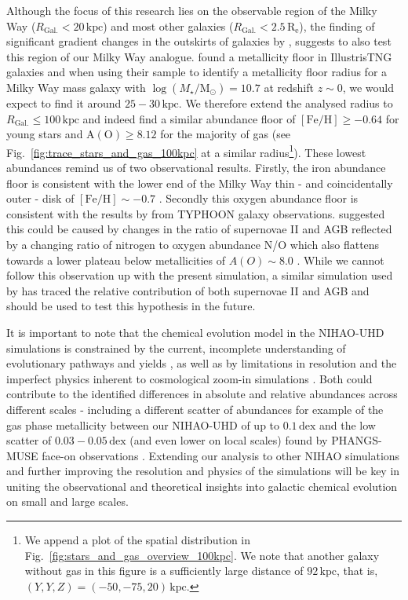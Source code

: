 \documentclass[twocolumn,apj,numberedappendix,appendixfloats]{openjournal}
\begin{document}
\begin{CJK*}{UTF8}{gbsn}
Although the focus of this research lies on the observable region of the Milky Way ($R_\mathrm{Gal.} < 20\,\mathrm{kpc}$) and most other galaxies ($R_\mathrm{Gal.} < 2.5\,\mathrm{R_e}$), the finding of significant gradient changes in the outskirts of galaxies by \citet{Garcia2023}, suggests to also test this region of our Milky Way analogue. \citet[][see their Fig.~4]{Garcia2023} found a metallicity floor in IllustrisTNG galaxies and when using their sample to identify a metallicity floor radius for a Milky Way mass galaxy with $\log(M_\star/\mathrm{M_\odot}) = 10.7$ \citep{BlandHawthorn_Gerhard2016} at redshift $z \sim 0$, we would expect to find it around $25-30\,\mathrm{kpc}$. We therefore extend the analysed radius to $R_\mathrm{Gal.} \leq 100\,\mathrm{kpc}$ and indeed find a similar abundance floor of $\mathrm{[Fe/H]} \geq -0.64$ for young stars and $\mathrm{A(O)} \geq 8.12$ for the majority of gas (see Fig.~\ref{fig:trace_stars_and_gas_100kpc} at a similar radius\footnote{We append a plot of the spatial distribution in Fig.~\ref{fig:stars_and_gas_overview_100kpc}. We note that another galaxy without gas in this figure is a sufficiently large distance of $92\,\mathrm{kpc}$, that is, $(Y,Y,Z) = (-50,-75,20)\,\mathrm{kpc}$.}). These lowest abundances remind us of two observational results. Firstly, the iron abundance floor is consistent with the lower end of the Milky Way thin - and coincidentally outer - disk of $\mathrm{[Fe/H]} \sim -0.7$ \citep{Bensby2014, Buder2019}. Secondly this oxygen abundance floor is consistent with the results by \citet{Grasha2022} from TYPHOON galaxy observations. \citet{Grasha2022} suggested this could be caused by changes in the ratio of supernovae II and AGB reflected by a changing ratio of nitrogen to oxygen abundance N/O which also flattens towards a lower plateau below metallicities of $A(O) \sim 8.0$ \citep{Nicholls2017}. While we cannot follow this observation up with the present simulation, a similar simulation used by \citet{Buder2024} has traced the relative contribution of both supernovae II and AGB and should be used to test this hypothesis in the future.

It is important to note that the chemical evolution model in the NIHAO-UHD simulations is constrained by the current, incomplete understanding of evolutionary pathways and yields \citep{Buck2021}, as well as by limitations in resolution and the imperfect physics inherent to cosmological zoom-in simulations \citep{Buck2020}.
Both could contribute to the identified differences in absolute and relative abundances across different scales - including a different scatter of abundances for example of the gas phase metallicity between our NIHAO-UHD of up to $0.1\,\mathrm{dex}$ and the low scatter of $0.03-0.05\,\mathrm{dex}$ (and even lower on local scales) found by PHANGS-MUSE face-on observations \citep{Kreckel2020}. Extending our analysis to other NIHAO simulations and further improving the resolution and physics of the simulations will be key in uniting the observational and theoretical insights into galactic chemical evolution on small and large scales.


\end{CJK*}
\end{document}
